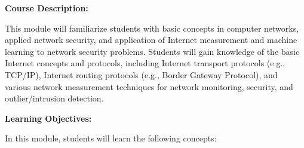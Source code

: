 \documentclass[12pt]{article}
\renewcommand{\_}{\kern-1.5pt\textunderscore\kern-1.5pt}
\begin{document}

\textbf{Course Description:}\par

This module will familiarize students with basic concepts in computer networks, applied network security, and application of Internet measurement and machine learning to network security problems. Students will gain knowledge of the basic Internet concepts and protocols, including Internet transport protocols (e.g., TCP/IP), Internet routing protocols (e.g., Border Gateway Protocol), and various network measurement techniques for network monitoring, security, and outlier/intrusion detection. \par

\textbf{Learning Objectives:}\par

In this module, students will learn the following concepts:\par
\end{document}
